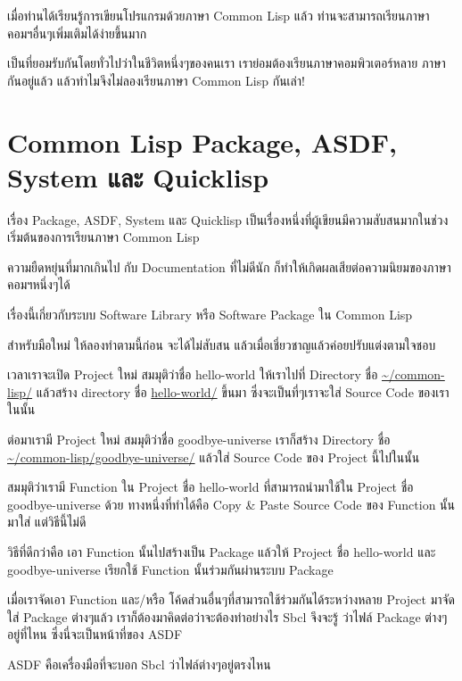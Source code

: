 \documentclass[a4paper]{article}
\begin{document}
เมื่อท่านได้เรียนรู้การเขียนโปรแกรมด้วยภาษา Common Lisp แล้ว ท่านจะสามารถเรียนภาษา%
คอมฯอื่นๆเพิ่มเติมได้ง่ายขึ้นมาก

เป็นที่ยอมรับกันโดยทั่วไปว่าในชีวิตหนึ่งๆของคนเรา เราย่อมต้องเรียนภาษาคอมพิวเตอร์หลาย%
ภาษากันอยู่แล้ว แล้วทำไมจึงไม่ลองเรียนภาษา Common Lisp กันเล่า!


\section{Common Lisp Package, ASDF, System และ Quicklisp}

เรื่อง Package, ASDF, System และ Quicklisp
เป็นเรื่องหนึ่งที่ผู้เขียนมีความสับสนมากในช่วงเริ่มต้นของการเรียนภาษา Common Lisp

ความยืดหยุ่นที่มากเกินไป กับ Documentation ที่ไม่ดีนัก
ก็ทำให้เกิดผลเสียต่อความนิยมของภาษาคอมฯหนึ่งๆได้

เรื่องนี้เกี่ยวกับระบบ Software Library หรือ Software Package ใน Common Lisp

สำหรับมือใหม่ ให้ลองทำตามนี้ก่อน จะได้ไม่สับสน แล้วเมื่อเชี่ยวชาญแล้วค่อยปรับแต่งตามใจชอบ

เวลาเราจะเปิด Project ใหม่ สมมุติว่าชื่อ hello-world ให้เราไปที่ Directory ชื่อ
\url{~/common-lisp/} แล้วสร้าง directory ชื่อ \url{hello-world/} ขึ้นมา
ซึ่งจะเป็นที่ๆเราจะใส่ Source Code ของเราในนั้น

ต่อมาเรามี Project ใหม่ สมมุติว่าชื่อ goodbye-universe เราก็สร้าง Directory ชื่อ
\url{~/common-lisp/goodbye-universe/} แล้วใส่ Source Code ของ Project
นี้ไปในนั้น

สมมุติว่าเรามี Function ใน Project ชื่อ hello-world ที่สามารถนำมาใช้ใน Project ชื่อ
goodbye-universe ด้วย ทางหนึ่งที่ทำได้คือ Copy \& Paste Source Code ของ
Function นั้นมาใส่ แต่วิธีนี้ไม่ดี

วิธีที่ดีกว่าคือ เอา Function นั้นไปสร้างเป็น Package แล้วให้ Project ชื่อ
hello-world และ goodbye-universe เรียกใช้ Function นั้นร่วมกันผ่านระบบ Package

เมื่อเราจัดเอา Function และ/หรือ โค้ดส่วนอื่นๆที่สามารถใช้ร่วมกันได้ระหว่างหลาย
Project มาจัดใส่ Package ต่างๆแล้ว เราก็ต้องมาคิดต่อว่าจะต้องทำอย่างไร Sbcl จึงจะรู้%
ว่าไฟล์ Package ต่างๆอยู่ที่ไหน ซึ่งนี่จะเป็นหน้าที่ของ ASDF

ASDF คือเครื่องมือที่จะบอก Sbcl ว่าไฟล์ต่างๆอยู่ตรงไหน
\end{document}
